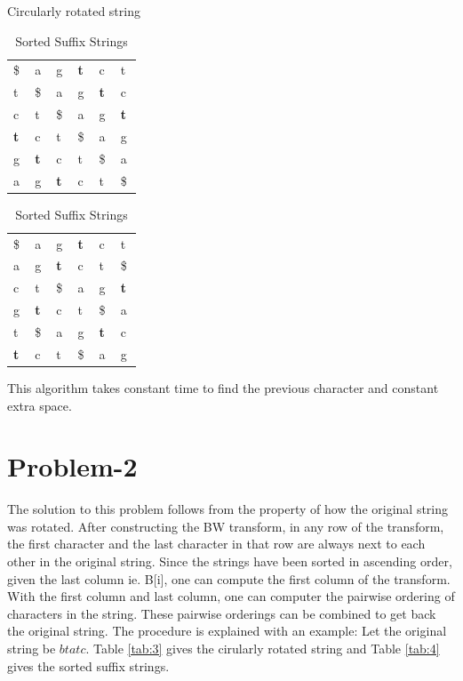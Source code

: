 \documentclass{article}
\begin{document}
\begin{table}[ht]
	\begin{minipage}[b]{0.4\linewidth}\centering
		\caption{Circularly rotated string}
		\label{tab:1}
		\begin{tabular}{llllll}
			\$ & a & g & \textbf{t} & \textcircled{c} & t \\
			t & \$ & a & g & \textbf{t} & \textcircled{c} \\
			\textcircled{c} & t & \$ & a & g & \textbf{t} \\
			\textbf{t} & \textcircled{c} & t & \$ & a & g \\
			g & \textbf{t} & \textcircled{c} & t & \$ & a \\
			a & g & \textbf{t} & \textcircled{c} & t & \$  \\
		\end{tabular}
	\end{minipage}
	\hspace{0.3cm}
	\begin{minipage}[b]{0.4\linewidth} \centering
		\caption{Sorted Suffix Strings}
		\label{tab:2}
		\begin{tabular}{llllll}
			\$ & a & g & \textbf{t} & \textcircled{c} & t \\
			a & g & \textbf{t} & \textcircled{c} & t & \$  \\
			\textcircled{c} & t & \$ & a & g & \textbf{t} \\
			g & \textbf{t} & \textcircled{c} & t & \$ & a \\									
			t & \$ & a & g & \textbf{t} & \textcircled{c} \\
			\textbf{t} & \textcircled{c} & t & \$ & a & g \\
		\end{tabular}
	\end{minipage}
\end{table}

This algorithm takes constant time to find the previous character and constant extra space.
\section{Problem-2}
The solution to this problem follows from the property of how the original string was rotated. After constructing the BW transform, in any row of the transform, the first character and the last character in that row are always next to each other in the original string. Since the strings have been sorted in ascending order, given the last column ie. B[i], one can compute the first column of the transform. With the first column and last column, one can computer the pairwise ordering of characters in the string. These pairwise orderings can be combined to get back the original string. The procedure is explained with an example: Let the original string be $btatc$. Table \ref{tab:3} gives the cirularly rotated string and Table \ref{tab:4} gives the sorted suffix strings.
\end{document}

